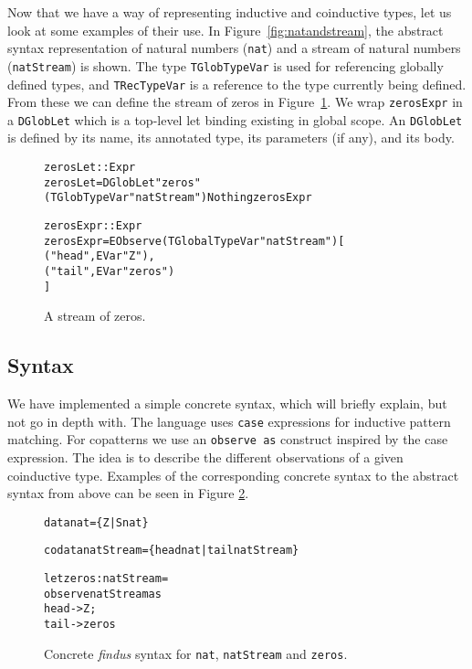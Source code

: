 Now that we have a way of representing inductive and coinductive types, let us look at some examples of their use. In Figure~\ref{fig:natandstream}, the abstract syntax representation of natural numbers (\texttt{nat}) and a stream of natural numbers (\texttt{natStream}) is shown. The type \texttt{TGlobTypeVar} is used for referencing globally defined types, and \texttt{TRecTypeVar} is a reference to the type currently being defined. From these we can define the stream of zeros in Figure~\ref{fig:astzeros}. We wrap \texttt{zerosExpr} in a \texttt{DGlobLet} which is a top-level let binding existing in global scope. An \texttt{DGlobLet} is defined by its name, its annotated type, its parameters (if any), and its body.

\begin{figure}
\begin{alltt}
zerosLet :: Expr
zerosLet = DGlobLet "zeros" (TGlobTypeVar "natStream") Nothing zerosExpr

zerosExpr :: Expr
zerosExpr = EObserve (TGlobalTypeVar "natStream") [
            ("head", EVar "Z"),
            ("tail", EVar "zeros")
        ]
\end{alltt}
\caption{A stream of zeros.}
\label{fig:astzeros}
\end{figure}

\subsection{Syntax}
We have implemented a simple concrete syntax, which will briefly explain, but not go in depth with. The language uses \texttt{case} expressions for inductive pattern matching. For copatterns we use an \texttt{observe as} construct inspired by the case expression. The idea is to describe the different observations of a given coinductive type. Examples of the corresponding concrete syntax to the abstract syntax from above can be seen in Figure \ref{fig:concrete_syntax}.

\begin{figure}
\begin{alltt}
data nat = \{Z | S nat\}

codata natStream = \{head nat | tail natStream\}

let zeros : natStream =
  observe natStream as
    head -> Z ;
    tail -> zeros
\end{alltt}
\caption{Concrete \textit{findus} syntax for \texttt{nat}, \texttt{natStream} and \texttt{zeros}.}
\label{fig:concrete_syntax}
\end{figure}

